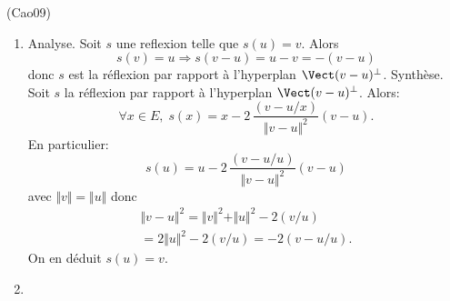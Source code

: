 \begin{tiny}(Cao09)\end{tiny}
\begin{enumerate}
  \item Analyse. Soit $s$ une reflexion telle que $s(u) = v$. Alors
\[
  s(v) = u \Rightarrow s(v-u) = u - v = -(v-u)
\]
donc $s$ est la réflexion par rapport à l'hyperplan $\Vect(v-u)^\bot$.\newline 
Synthèse. Soit $s$ la réflexion par rapport à l'hyperplan $\Vect(v-u)^\bot$. Alors:
\[
  \forall x \in E, \;
  s(x) = x - 2\, \frac{(v-u/x)}{\Vert v-u \Vert^2}(v-u).
\]
En particulier:
\[
  s(u) = u - 2\, \frac{(v-u/u)}{\Vert v-u \Vert^2}(v-u)
\]
avec $\Vert v \Vert = \Vert u \Vert$  donc 
\begin{multline*}
\Vert v-u \Vert^2
  = \Vert v \Vert^2 + \Vert u \Vert^2 - 2 (v / u)\\
  = 2 \Vert u \Vert^2 - 2 (v / u)
  = -2 (v - u / u).
\end{multline*}
On en déduit $s(u) = v$.
  \item 
\end{enumerate}
